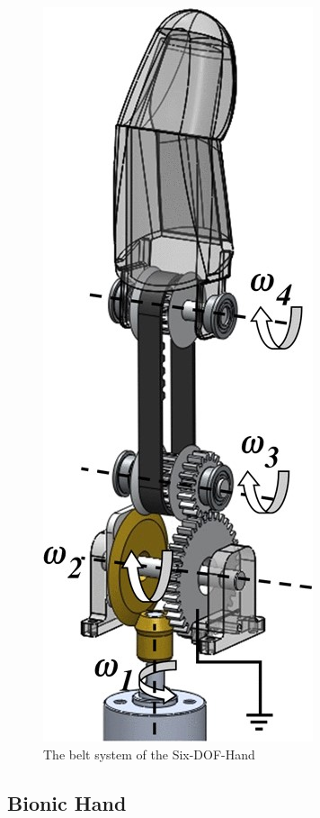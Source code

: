 \documentclass[a4paper, 10pt, conference]{ieeeconf}      %
\begin{document}
\begin{figure}[h]

	\centering
	\includegraphics[scale=0.25]{images/SixDoF2}
	
	\caption{The belt system of the Six-DOF-Hand}
	\label{fig:sixdof}
\end{figure}

\subsection{Bionic Hand}
\end{document}
